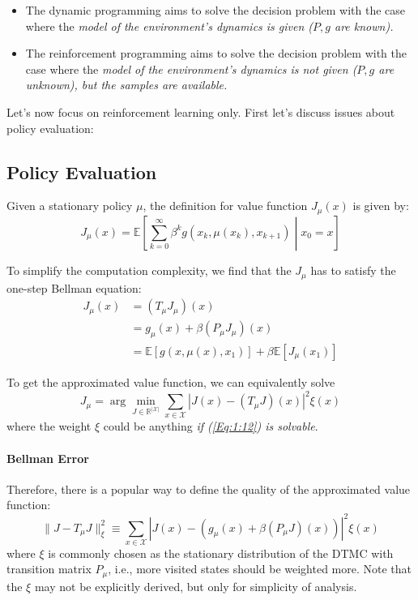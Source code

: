 \begin{itemize}
\item
The dynamic programming aims to solve the decision problem with the case where the \emph{model of the environment's dynamics is given ($P,g$ are known).}
\item
The reinforcement programming aims to solve the decision problem with the case where the \emph{model of the environment's dynamics is not given ($P,g$ are unknown), but the samples are available.}
\end{itemize}

Let's now focus on reinforcement learning only. First let's discuss issues about policy evaluation:
\subsection{Policy Evaluation}
Given a stationary policy $\mu$, the definition for value function $J_\mu(x)$ is given by:
\[
J_\mu(x)=\mathbb{E}\left[
\sum_{k=0}^\infty\beta^kg(x_k,\mu(x_k),x_{k+1})\middle|x_0=x
\right]
\]

To simplify the computation complexity, we find that the $J_\mu$ has to satisfy the one-step Bellman equation:
\begin{align*}
J_\mu(x)&=(T_\mu J_\mu)(x)\\
&=g_\mu(x)+\beta(P_\mu J_\mu)(x)\\
&=\mathbb{E}\left[g(x,\mu(x),x_1)\right]
+
\beta\mathbb{E}[J_\mu(x_1)]
\end{align*}

To get the approximated value function, we can equivalently solve
\begin{equation}\label{Eq:1:12}
J_\mu=\arg\min_{J\in\mathbb{R}^{|\mathcal{X}|}}\sum_{x\in\mathcal{X}}|J(x)-(T_\mu J)(x)|^2\xi(x)
\end{equation}
where the weight $\xi$ could be anything \emph{if (\ref{Eq:1:12}) is solvable}.

\paragraph{Bellman Error}
Therefore, there is a popular way to define the quality of the approximated value function:
\begin{equation}\label{Eq:1:13}
\|J-T_\mu J\|_{\xi}^2\equiv \sum_{x\in\mathcal{X}}|J(x)-(g_\mu(x)+\beta(P_\mu J)(x))|^2\xi(x)
\end{equation}
where $\xi$ is commonly chosen as the stationary distribution of the DTMC with transition matrix $P_\mu$, i.e., more visited states should be weighted more. Note that the $\xi$ may not be explicitly derived, but only for simplicity of analysis.

